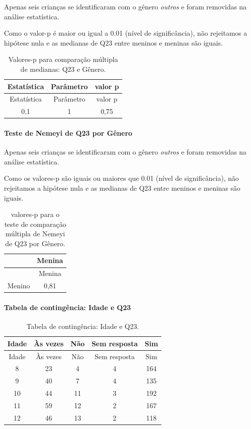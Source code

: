 \documentclass[]{article}
\let\oldparagraph\paragraph
\renewcommand{\paragraph}[1]{\oldparagraph{#1}\mbox{}}
\begin{document}
Apenas seis crianças se identificaram com o gênero \emph{outros} e foram removidas na análise estatística.

Como o valor-p é maior ou igual a 0.01 (nível de significância), não rejeitamos a hipótese nula e as medianas de Q23 entre meninos e meninas são iguais.

\begin{longtable}[]{@{}ccc@{}}
\caption{\label{tab:unnamed-chunk-561}Valores-p para comparação múltipla de medianas: Q23 e Gênero.}\tabularnewline
\toprule
Estatística & Parâmetro & valor p\tabularnewline
\midrule
\endfirsthead
\toprule
Estatística & Parâmetro & valor p\tabularnewline
\midrule
\endhead
0,1 & 1 & 0,75\tabularnewline
\bottomrule
\end{longtable}

\hypertarget{teste-de-nemeyi-de-q23-por-guxeanero}{%
\paragraph{Teste de Nemeyi de Q23 por Gênero}\label{teste-de-nemeyi-de-q23-por-guxeanero}}

Apenas seis crianças se identificaram com o gênero \emph{outros} e foram removidas na análise estatística.

Como os valores-p são iguais ou maiores que 0.01 (nível de significância), não rejeitamos a hipótese nula e as medianas de Q23 entre meninos e meninas são iguais.

\begin{longtable}[]{@{}lc@{}}
\caption{\label{tab:unnamed-chunk-563}valores-p para o teste de comparação múltipla de Nemeyi de Q23 por Gênero.}\tabularnewline
\toprule
& Menina\tabularnewline
\midrule
\endfirsthead
\toprule
& Menina\tabularnewline
\midrule
\endhead
Menino & 0,81\tabularnewline
\bottomrule
\end{longtable}

\cleardoublepage

\hypertarget{tabela-de-continguxeancia-idade-e-q23}{%
\paragraph{Tabela de contingência: Idade e Q23}\label{tabela-de-continguxeancia-idade-e-q23}}

\begin{longtable}[]{@{}ccccc@{}}
\caption{\label{tab:unnamed-chunk-564}Tabela de contingência: Idade e Q23.}\tabularnewline
\toprule
Idade & Às vezes & Não & Sem resposta & Sim\tabularnewline
\midrule
\endfirsthead
\toprule
Idade & Às vezes & Não & Sem resposta & Sim\tabularnewline
\midrule
\endhead
8 & 23 & 4 & 4 & 164\tabularnewline
9 & 40 & 7 & 4 & 135\tabularnewline
10 & 44 & 11 & 3 & 192\tabularnewline
11 & 59 & 12 & 2 & 167\tabularnewline
12 & 46 & 13 & 2 & 118\tabularnewline
\bottomrule
\end{longtable}
\end{document}
